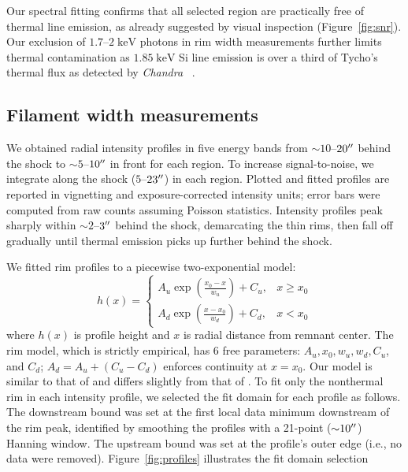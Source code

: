 \documentclass[iop, apj, numberedappendix]{emulateapj}
\newcommand*{\mt}{\mathrm}
\newcommand*{\unit}[1]{\;\mt{#1}}  %
\newcommand*{\abt}{\mathord{\sim}} %
\newcommand*{\Chandra}{\textit{Chandra}\ }
\begin{document}
Our spectral fitting confirms that all selected region are practically free of
thermal line emission, as already suggested by visual inspection
(Figure~\ref{fig:snr}).  Our exclusion of $1.7$--$2 \unit{keV}$ photons in rim
width measurements further limits thermal contamination as $1.85 \unit{keV}$ Si
line emission is over a third of Tycho's thermal flux as detected by \Chandra
\citep{hwang2002}.

\subsection{Filament width measurements}
\label{sec:fwhms}

We obtained radial intensity profiles in five energy bands from $\abt
10$--$20\mbox{$^{\prime\prime}$}$ behind the shock to $\abt 5$--$10\mbox{$^{\prime\prime}$}$ in front for each
region.  To increase signal-to-noise, we integrate along the shock
($5$--$23\mbox{$^{\prime\prime}$}$) in each region.  Plotted and fitted profiles are reported in
vignetting and exposure-corrected intensity units; error bars were computed from
raw counts assuming Poisson statistics.  Intensity profiles peak sharply within
$\abt 2$--$3\mbox{$^{\prime\prime}$}$ behind the shock, demarcating the thin rims, then fall off
gradually until thermal emission picks up further behind the shock.

We fitted rim profiles to a piecewise two-exponential model:
\begin{equation} \label{eq:prof}
    h(x) =
    \begin{cases}
        A_u \exp \left(\frac{x_0 - x}{w_u}\right) + C_u, &x \geq x_0 \\
        A_d \exp \left(\frac{x - x_0}{w_d}\right) + C_d, &x < x_0
    \end{cases}
\end{equation}
where $h(x)$ is profile height and $x$ is radial distance from remnant center.
The rim model, which is strictly empirical, has 6 free parameters:
$A_u, x_0, w_u, w_d, C_u$, and $C_d$; $A_d = A_u + (C_u - C_d)$ enforces
continuity at $x=x_0$. Our model is similar to that of \citet{bamba2003,
bamba2005-hist} and differs slightly from that of .
To fit only the nonthermal rim in each intensity profile, we selected the fit
domain for each profile as follows.  The downstream bound was set at the first
local data minimum downstream of the rim peak, identified by smoothing the
profiles with a 21-point ($\abt 10\arcsec$) Hanning window.  The upstream bound
was set at the profile's outer edge (i.e., no data were removed).
Figure~\ref{fig:profiles} illustrates the fit domain selection
\end{document}
